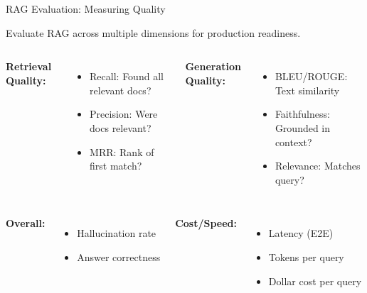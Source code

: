 \documentclass[aspectratio=169,11pt]{beamer}
\begin{document}
\begin{frame}{RAG Evaluation: Measuring Quality}
  \begin{tipbox}
    Evaluate RAG across multiple dimensions for production readiness.
  \end{tipbox}

  \begin{columns}[T]
    \textbf{Retrieval Quality:}
    \begin{itemize}
    \setlength{\itemsep}{1pt}
      \item Recall: Found all relevant docs?
      \item Precision: Were docs relevant?
      \item MRR: Rank of first match?
    \end{itemize}

    \textbf{Generation Quality:}
    \begin{itemize}
    \setlength{\itemsep}{1pt}
      \item BLEU/ROUGE: Text similarity
      \item Faithfulness: Grounded in context?
      \item Relevance: Matches query?
    \end{itemize}
  \end{columns}

  \begin{columns}[T]
    \textbf{Overall:}
    \begin{itemize}
    \setlength{\itemsep}{1pt}
      \item Hallucination rate
      \item Answer correctness
    \end{itemize}

    \textbf{Cost/Speed:}
    \begin{itemize}
    \setlength{\itemsep}{1pt}
      \item Latency (E2E)
      \item Tokens per query
      \item Dollar cost per query
    \end{itemize}
  \end{columns}
\end{frame}
\end{document}
